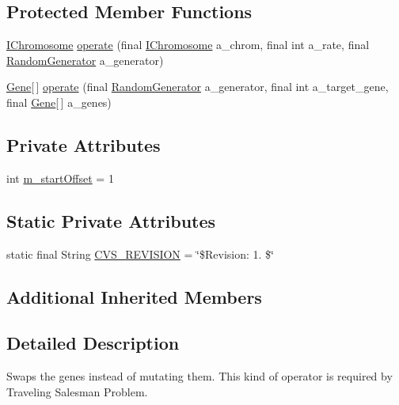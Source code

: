 \subsection*{Protected Member Functions}
\begin{DoxyCompactItemize}
\item 
\hyperlink{interfaceorg_1_1jgap_1_1_i_chromosome}{I\-Chromosome} \hyperlink{classorg_1_1jgap_1_1impl_1_1_swapping_mutation_operator_a43cda60692e8d1a1fcecb6a0e4e00073}{operate} (final \hyperlink{interfaceorg_1_1jgap_1_1_i_chromosome}{I\-Chromosome} a\-\_\-chrom, final int a\-\_\-rate, final \hyperlink{interfaceorg_1_1jgap_1_1_random_generator}{Random\-Generator} a\-\_\-generator)
\item 
\hyperlink{interfaceorg_1_1jgap_1_1_gene}{Gene}\mbox{[}$\,$\mbox{]} \hyperlink{classorg_1_1jgap_1_1impl_1_1_swapping_mutation_operator_a4fdd309d7274d97a6a4ecfa68910a381}{operate} (final \hyperlink{interfaceorg_1_1jgap_1_1_random_generator}{Random\-Generator} a\-\_\-generator, final int a\-\_\-target\-\_\-gene, final \hyperlink{interfaceorg_1_1jgap_1_1_gene}{Gene}\mbox{[}$\,$\mbox{]} a\-\_\-genes)
\end{DoxyCompactItemize}
\subsection*{Private Attributes}
\begin{DoxyCompactItemize}
\item 
int \hyperlink{classorg_1_1jgap_1_1impl_1_1_swapping_mutation_operator_a542b0fe73976a2e9f45cf45402127b39}{m\-\_\-start\-Offset} = 1
\end{DoxyCompactItemize}
\subsection*{Static Private Attributes}
\begin{DoxyCompactItemize}
\item 
static final String \hyperlink{classorg_1_1jgap_1_1impl_1_1_swapping_mutation_operator_a0ffd35f7d9b1437b5cb2c4bbcd3687de}{C\-V\-S\-\_\-\-R\-E\-V\-I\-S\-I\-O\-N} = \char`\"{}\$Revision\-: 1. \$\char`\"{}
\end{DoxyCompactItemize}
\subsection*{Additional Inherited Members}


\subsection{Detailed Description}
Swaps the genes instead of mutating them. This kind of operator is required by Traveling Salesman Problem.

